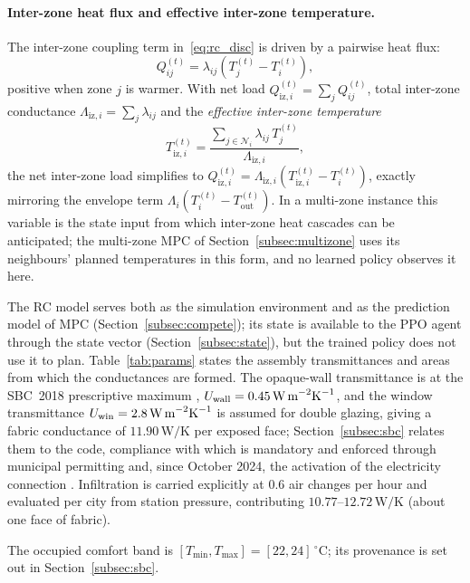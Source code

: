 \documentclass[pdflatex,sn-mathphys-num,iicol]{sn-jnl}
\theoremstyle{thmstyleone}\newtheorem{proposition}{Proposition}\newtheorem{corollary}{Corollary}
\theoremstyle{thmstyletwo}\newtheorem{remark}{Remark}\newtheorem{observation}{Observation}
\theoremstyle{thmstylethree}\newtheorem{definition}{Definition}
\newcommand{\Tmin}{T_{\min}}
\newcommand{\Tmax}{T_{\max}}
\newcommand{\Tout}{T_{\mathrm{out}}}
\newcommand{\lij}{\lambda_{ij}}
\newcommand{\Liz}[1]{\Lambda_{\mathrm{iz},#1}}
\newcommand{\Tiz}[1]{T_{\mathrm{iz},#1}}
\newcommand{\Qiz}[1]{Q_{\mathrm{iz},#1}}
\begin{document}
\paragraph{Inter-zone heat flux and effective inter-zone temperature.}
The inter-zone coupling term in~\eqref{eq:rc_disc} is driven by a pairwise heat flux:
\begin{equation}
  Q_{ij}^{(t)} = \lij\!\left(T_j^{(t)}-T_i^{(t)}\right),
  \label{eq:qij}
\end{equation}
positive when zone $j$ is warmer. With net load $\Qiz{i}^{(t)}=\sum_j Q_{ij}^{(t)}$, total inter-zone conductance $\Liz{i}=\sum_j\lij$ and the \emph{effective inter-zone temperature}
\begin{equation}
  \Tiz{i}^{(t)}
  =\frac{\displaystyle\sum_{j\in\mathcal{N}_i}\lij\,T_j^{(t)}}{\Liz{i}},
  \label{eq:tiz}
\end{equation}
the net inter-zone load simplifies to $\Qiz{i}^{(t)}=\Liz{i}\!\left(\Tiz{i}^{(t)}-T_i^{(t)}\right)$, exactly mirroring the envelope term $\Lambda_i(T_i^{(t)}-\Tout^{(t)})$. In a multi-zone instance this variable is the state input from which inter-zone heat cascades can be anticipated; the multi-zone MPC of Section~\ref{subsec:multizone} uses its neighbours' planned temperatures in this form, and no learned policy observes it here.
 
The RC model serves both as the simulation environment and as the prediction model of MPC (Section~\ref{subsec:compete}); its state is available to the PPO agent through the state vector (Section~\ref{subsec:state}), but the trained policy does not use it to plan. Table~\ref{tab:params} states the assembly transmittances and areas from which the conductances are formed. The opaque-wall transmittance is at the SBC~2018 prescriptive maximum \citep{Alayed2021}, $U_{\mathrm{wall}}=0.45\,\text{W\,m}^{-2}\text{K}^{-1}$, and the window transmittance $U_{\mathrm{win}}=2.8\,\text{W\,m}^{-2}\text{K}^{-1}$ is assumed for double glazing, giving a fabric conductance of $11.90\,\text{W/K}$ per exposed face; Section~\ref{subsec:sbc} relates them to the code, compliance with which is mandatory and enforced through municipal permitting and, since October 2024, the activation of the electricity connection \citep{SBCgov2024}. Infiltration is carried explicitly at $0.6$ air changes per hour and evaluated per city from station pressure, contributing $10.77$--$12.72\,\mathrm{W/K}$ (about one face of fabric).

The occupied comfort band is $[\Tmin,\Tmax]{=}[22,24]\,^\circ$C; its provenance is set out in Section~\ref{subsec:sbc}.
 
\end{document}
